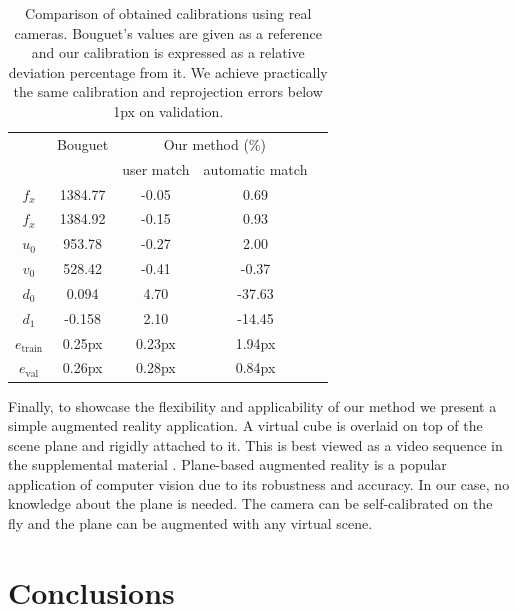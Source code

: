 \documentclass[10pt,twocolumn,letterpaper]{article}
\begin{document}
\begin{table}
\caption{Comparison of obtained calibrations using real cameras. Bouguet's values are given as a reference and our calibration is expressed as a relative deviation percentage from it. We achieve practically the same calibration and reprojection errors below 1px on validation.}
\label{fig:results_real_numbers}
\centering
\begin{tabular}{|c|c|c|c|c|}
\hline
& Bouguet \cite{bouguetMCT} & \multicolumn{2}{|c|}{Our method (\%)} \\
& & user match & automatic match  \\
 \hline
$f_x$ & 1384.77 & -0.05 & 0.69 \\
$f_x$ & 1384.92 & -0.15 & 0.93 \\
$u_0$ & 953.78 & -0.27 &  2.00 \\
$v_0$ & 528.42 & -0.41 &  -0.37 \\
$d_0$ & 0.094 & 4.70  &  -37.63 \\
$d_1$ & -0.158 & 2.10 &  -14.45 \\
  \hline
  $e_{\text{train}}$ & 0.25px & 0.23px & 1.94px\\ 
$e_{\text{val}}$ & 0.26px & 0.28px & 0.84px \\ 
  \hline
\end{tabular}
\end{table}

Finally, to showcase the flexibility and applicability of our method we present a simple augmented reality application. A virtual cube is overlaid on top of the scene plane and rigidly attached to it. This is best viewed as a video sequence in the supplemental material
. Plane-based augmented reality is a popular application of computer vision due to its robustness and accuracy. In our case, no knowledge about the plane is needed. The camera can be self-calibrated on the fly and the plane can be augmented with any virtual scene.


\section{Conclusions}
\end{document}
